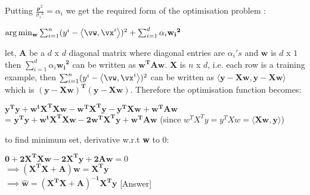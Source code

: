 \documentclass[a4paper,11pt]{article}
\begin{document}
\begin{mlsolution}
Putting $\frac{\mathbf{\rho}^2}{{\sigma_i}^2} = \alpha_i$ we get the required form of the optimisation problem :
\begin{center}
	$\arg\min_{\mathbf{w}} \sum_{i=1}^n(y^i - \ip{\vw}{\vx^i})^2 + \sum_{i = 1}^{d} \alpha_i\mathbf{{w_i}^2}$
\end{center} 
let, $\textbf{A}$ be a $d$ x $d$ diagonal matrix where diagonal entries are $\alpha_i's$ and $\mathbf{w}$ is $d$ x $1$ then $\sum_{i = 1}^{d} \alpha_i\mathbf{{w_i}^2}$ can be written as $\mathbf{w^TAw}$. \textbf{X} is $n$ x $d$, i.e. each row is a training example, then $\sum_{i=1}^n(y^i - \ip{\vw}{\vx^i})^2$ can be written as $\langle{\mathbf{y-Xw},\mathbf{y-Xw}}\rangle$ which is $\mathbf{(y-Xw)^T(y-Xw)}$.
Therefore the optimisation function becomes:
\begin{center}
$\mathbf{y^Ty + w^tX^TXw - w^TX^Ty - y^TXw + w^TAw}$ \\ = $\mathbf{y^Ty + w^tX^TXw - 2w^TX^Ty + w^TAw}$ (since $w^TX^Ty = y^TXw = \langle\mathbf{Xw},\mathbf{y}\rangle$)
\end{center}
to find minimum set, derivative w.r.t \textbf{w} to 0: 
\begin{center}
	$\mathbf{0 + 2X^TXw - 2X^Ty + 2Aw} = 0$\\
	$\implies \mathbf{(X^TX + A)w = X^Ty}$\\
	$\implies \mathbf{\widehat{w} = {(X^TX + A)}^{-1}X^Ty}$ [Answer]
\end{center}
\end{mlsolution}
\end{document}
